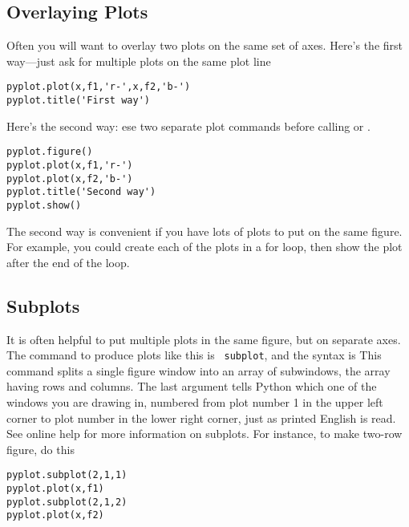 \subsection*{Overlaying Plots}
  Often you will want to
overlay two plots on the same set of axes.
Here's the first way---just ask for multiple plots on the
same plot line
\begin{Verbatim}
pyplot.plot(x,f1,'r-',x,f2,'b-')
pyplot.title('First way')
\end{Verbatim}
Here's the second way: ese two separate plot commands before calling  or .
\begin{Verbatim}
pyplot.figure()
pyplot.plot(x,f1,'r-')
pyplot.plot(x,f2,'b-')
pyplot.title('Second way')
pyplot.show()
\end{Verbatim}
The second way is convenient if you have lots of plots to put on
the same figure.  For example, you could create each of the plots in a for loop, then show the plot after the end of the loop.

\subsection*{Subplots}

It is often helpful to put multiple plots in the same figure, but
on separate axes. The command to produce plots like this is {\tt
subplot}, and the syntax is  This command splits a single figure window into an array
of subwindows, the array having  rows and 
columns. The last argument tells Python which one of the windows
you are drawing in, numbered from plot number 1 in the upper left
corner to plot number  in the lower right corner,
just as printed English is read. See online help for more
information on subplots.  For instance, to make two-row figure, do
this
\begin{Verbatim}
pyplot.subplot(2,1,1)
pyplot.plot(x,f1)
pyplot.subplot(2,1,2)
pyplot.plot(x,f2)
\end{Verbatim}



